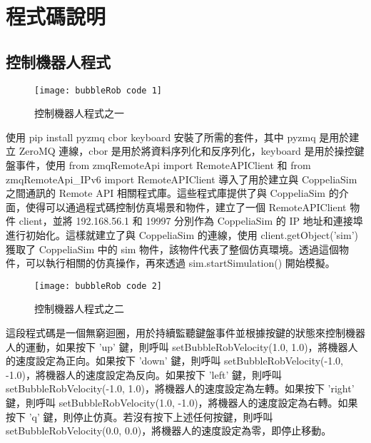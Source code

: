 \chapter{程式碼說明}
\renewcommand{\baselinestretch}{10.0} %
\setcounter{page}{5}  %
\fontsize{14pt}{2.5pt}\sectionef

\section{控制機器人程式}
\begin{figure}[hbt!]
\begin{center}
\texttt{[image: bubbleRob code 1]}
\caption{\Large 控制機器人程式之一}\label{控制機器人程式之一}
\end{center}
\end{figure} 
使用 pip install pyzmq cbor keyboard 安裝了所需的套件，其中 pyzmq 是用於建立 ZeroMQ 連線，cbor 是用於將資料序列化和反序列化，keyboard 是用於操控鍵盤事件，使用 from zmqRemoteApi import RemoteAPIClient 和 from zmqRemoteApi_IPv6 import RemoteAPIClient 導入了用於建立與 CoppeliaSim 之間通訊的 Remote API 相關程式庫。這些程式庫提供了與 CoppeliaSim 的介面，使得可以通過程式碼控制仿真場景和物件，建立了一個 RemoteAPIClient 物件 client，並將 192.168.56.1 和 19997 分別作為 CoppeliaSim 的 IP 地址和連接埠進行初始化。這樣就建立了與 CoppeliaSim 的連線，使用 client.getObject('sim') 獲取了 CoppeliaSim 中的 sim 物件，該物件代表了整個仿真環境。透過這個物件，可以執行相關的仿真操作，再來透過  sim.startSimulation() 開始模擬。\\[6pt]
\begin{figure}[hbt!]
\begin{center}
\texttt{[image: bubbleRob code 2]}
\caption{\Large 控制機器人程式之二}\label{控制機器人程式之二}
\end{center}
\end{figure} 
這段程式碼是一個無窮迴圈，用於持續監聽鍵盤事件並根據按鍵的狀態來控制機器人的運動，如果按下 'up' 鍵，則呼叫 setBubbleRobVelocity(1.0, 1.0)，將機器人的速度設定為正向。如果按下 'down' 鍵，則呼叫 setBubbleRobVelocity(-1.0, -1.0)，將機器人的速度設定為反向。如果按下 'left' 鍵，則呼叫 setBubbleRobVelocity(-1.0, 1.0)，將機器人的速度設定為左轉。如果按下 'right' 鍵，則呼叫 setBubbleRobVelocity(1.0, -1.0)，將機器人的速度設定為右轉。如果按下 'q' 鍵，則停止仿真。若沒有按下上述任何按鍵，則呼叫 setBubbleRobVelocity(0.0, 0.0)，將機器人的速度設定為零，即停止移動。\\[6pt]
\renewcommand{\baselinestretch}{0.5} %
